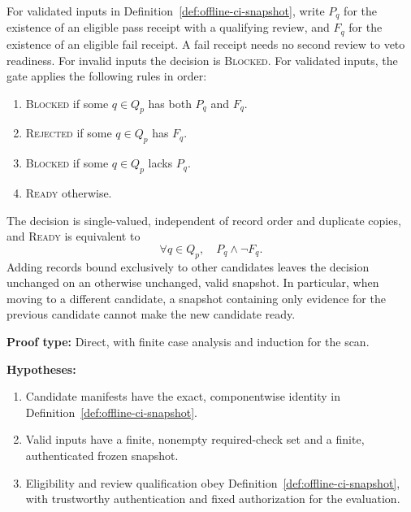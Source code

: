 \begin{theorem}
\label{thm:offline-ci-acceptance}
For validated inputs in Definition~\ref{def:offline-ci-snapshot},
write $P_q$ for the existence of an eligible pass receipt with a
qualifying review, and $F_q$ for the existence of an eligible fail
receipt. A fail receipt needs no second review to veto readiness.
For invalid inputs the decision is \textsc{Blocked}. For validated
inputs, the gate applies the following rules in order:
\begin{enumerate}
\item \textsc{Blocked} if some $q\in Q_p$ has both $P_q$ and $F_q$.
\item \textsc{Rejected} if some $q\in Q_p$ has $F_q$.
\item \textsc{Blocked} if some $q\in Q_p$ lacks $P_q$.
\item \textsc{Ready} otherwise.
\end{enumerate}
The decision is single-valued, independent of record order and
duplicate copies, and \textsc{Ready} is equivalent to
\begin{equation}
\label{eq:offline-ci-ready}
   \forall q\in Q_p,\quad P_q\land\neg F_q .
\end{equation}
Adding records bound exclusively to other candidates leaves the
decision unchanged on an otherwise unchanged, valid snapshot.
In particular, when moving to a different candidate, a snapshot
containing only evidence for the previous candidate cannot make the
new candidate ready.
\end{theorem}

\noindent\textbf{Proof type:} Direct, with finite case analysis and
induction for the scan.

\noindent\textbf{Hypotheses:}
\begin{enumerate}[label=H\arabic*.]
\item\label{hyp:offline-manifests} Candidate manifests have the exact,
componentwise identity in Definition~\ref{def:offline-ci-snapshot}.
\item\label{hyp:offline-validation} Valid inputs have a finite,
nonempty required-check set and a finite, authenticated frozen snapshot.
\item\label{hyp:offline-authentication} Eligibility and review
qualification obey Definition~\ref{def:offline-ci-snapshot}, with
trustworthy authentication and fixed authorization for the evaluation.
\end{enumerate}


